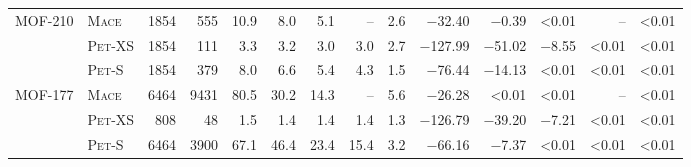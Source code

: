\begin{tabular}{llrr rrrr>{\columncolor{exactshade}}r rrrr>{\columncolor{exactshade}}r}
\midrule
         MOF-210  &     \textsc{Mace}  &        \num{1854}  &         \num{555}  &        \num{10.9}  &         \num{8.0}  &         \num{5.1}  &                --  &         \num{2.6}  &      \num{-32.40}  &       \num{-0.39}  &       \num{<0.01}  &                --  &       \num{<0.01} \\ 
                  &   \textsc{Pet}-XS  &        \num{1854}  &         \num{111}  &         \num{3.3}  &         \num{3.2}  &         \num{3.0}  &         \num{3.0}  &         \num{2.7}  &     \num{-127.99}  &      \num{-51.02}  &       \num{-8.55}  &       \num{<0.01}  &       \num{<0.01} \\ 
                  &    \textsc{Pet}-S  &        \num{1854}  &         \num{379}  &         \num{8.0}  &         \num{6.6}  &         \num{5.4}  &         \num{4.3}  &         \num{1.5}  &      \num{-76.44}  &      \num{-14.13}  &       \num{<0.01}  &       \num{<0.01}  &       \num{<0.01} \\ 
\midrule
         MOF-177  &     \textsc{Mace}  &        \num{6464}  &        \num{9431}  &        \num{80.5}  &        \num{30.2}  &        \num{14.3}  &                --  &         \num{5.6}  &      \num{-26.28}  &       \num{<0.01}  &       \num{<0.01}  &                --  &       \num{<0.01} \\ 
                  &   \textsc{Pet}-XS  &         \num{808}  &          \num{48}  &         \num{1.5}  &         \num{1.4}  &         \num{1.4}  &         \num{1.4}  &         \num{1.3}  &     \num{-126.79}  &      \num{-39.20}  &       \num{-7.21}  &       \num{<0.01}  &       \num{<0.01} \\ 
                  &    \textsc{Pet}-S  &        \num{6464}  &        \num{3900}  &        \num{67.1}  &        \num{46.4}  &        \num{23.4}  &        \num{15.4}  &         \num{3.2}  &      \num{-66.16}  &       \num{-7.37}  &       \num{<0.01}  &       \num{<0.01}  &       \num{<0.01} \\ 
\bottomrule
\end{tabular}
